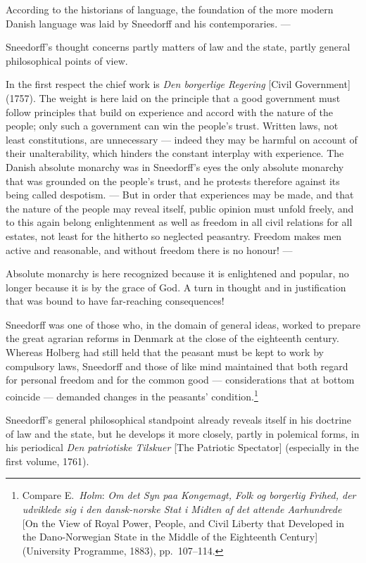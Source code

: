 \documentclass[12pt,a4paper]{book}
\newcommand{\opage}[1]{\marginnote{\footnotesize\textit{[#1]}}}
\begin{document}
According to the historians of language, the foundation of the more modern Danish
language was laid by Sneedorff and his contemporaries. ---

Sneedorff's thought concerns partly matters of law and the state, partly general
philosophical points of view.

In the first respect the chief work is \emph{Den borgerlige Regering} [Civil
Government] (1757). The weight is here laid on the principle that a good
government must follow principles that build on experience and accord with the
nature of the people; only such a government can win the people's trust. Written
laws, not least constitutions, are unnecessary --- indeed they may be harmful on
account of their unalterability, which hinders the constant interplay with
experience. The Danish absolute monarchy was in Sneedorff's eyes the only
absolute monarchy that was grounded on the people's trust, and he protests
therefore against its being called despotism. --- But in order that experiences
may be made, and that the nature of the people may reveal itself, public opinion
must unfold freely, and to this again belong enlightenment as well as freedom in
all civil relations for all estates, not least for the hitherto so neglected
peasantry. Freedom makes men active and reasonable, and without freedom there is
no honour! ---

Absolute monarchy is here recognized because it is enlightened and popular, no
longer because it is by the grace of God. A turn in thought and in justification
that was bound to have far-reaching consequences!

Sneedorff was one of those who, in the domain of general ideas, worked to prepare
the great agrarian reforms in Denmark at the close of the eighteenth century.
Whereas Holberg had still held that the peasant must be kept to work by
compulsory laws, Sneedorff and those of like mind maintained that both regard for
personal freedom and for the common good --- considerations that at bottom
coincide --- demanded changes in the peasants' condition.\footnote{Compare E.\
\emph{Holm}: \emph{Om det Syn paa Kongemagt, Folk og borgerlig Frihed, der udviklede sig
i den dansk-norske Stat i Midten af det attende Aarhundrede} [On the View of
Royal Power, People, and Civil Liberty that Developed in the Dano-Norwegian State
in the Middle of the Eighteenth Century] (University Programme, 1883),
pp.~107--114.}

\opage{18}Sneedorff's general philosophical standpoint already reveals itself in his
doctrine of law and the state, but he develops it more closely, partly in
polemical forms, in his periodical \emph{Den patriotiske Tilskuer} [The Patriotic
Spectator] (especially in the first volume, 1761).
\end{document}

